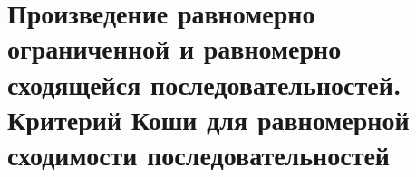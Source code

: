 \section{Произведение равномерно ограниченной и равномерно сходящейся последовательностей. Критерий Коши для равномерной сходимости последовательностей}
